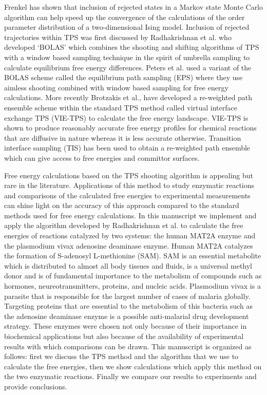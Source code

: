 \documentclass[journal=jpcbfk,manuscript=article,layout=traditional]{achemso}
\begin{document}
Frenkel has shown that inclusion of rejected states in a Markov state Monte 
Carlo algorithm can help speed up the convergence of the calculations of 
the order parameter distribution of a two-dimensional
Ising model. \cite{Frenkel04ProcNatAcadSci101p17571}
Inclusion of rejected trajectories within TPS was first discussed by Radhakrishnan 
et al. \cite{Radhakrishnan04JChemPhys121p2436} who developed `BOLAS' which combines 
the shooting and shifting algorithms of TPS with a window based sampling technique 
in the spirit of umbrella sampling to calculate equilibrium free energy 
differences. Peters et al. used a variant of the BOLAS scheme called the 
equilibrium path sampling (EPS) where they use aimless shooting 
combined with window based sampling for free energy calculations. 
\cite{Peters08JAmChemSoc130p17342,Beckham10epsbook} 
More recently Brotzakis et al., \cite{Brotzakis19JChemPhys151p174111}
have developed a re-weighted path ensemble scheme within the standard TPS method 
called virtual interface exchange TPS (VIE-TPS) to calculate the free energy 
landscape. VIE-TPS is shown to produce reasonably accurate free energy profiles for 
chemical reactions that are diffusive in nature whereas it is less accurate otherwise.
Transition interface sampling (TIS) has been used to obtain 
a re-weighted path ensemble which can give access to free energies 
and committor surfaces. \cite{Rogal10JChemPhys17p174109}

Free energy calculations based on the TPS shooting algorithm is 
appealing but rare in the literature. Applications of this 
method to study enzymatic reactions and comparisons of the calculated 
free energies to experimental measurements can shine light on the 
accuracy of this approach compared to the standard methods used for 
free energy calculations.    
In this manuscript we implement and apply the 
algorithm developed by Radhakrishnan et al. \cite{Radhakrishnan04JChemPhys121p2436} 
to calculate the free energies of reactions catalyzed by two systems:
the human MAT2A enzyme and the plasmodium vivax adenosine deaminase 
enzyme. \cite{Luo07JAmChemSoc129p8008,Ho09Biochemistry48p9618}
Human MAT2A catalyzes the formation of S-adenosyl L-methionine (SAM).
SAM is an essential metabolite which is 
distributed to almost all body tissues and fluids, is a universal 
methyl donor and is of fundamental importance to the metabolism of 
compounds such as hormones, neureotransmitters, proteins, 
and nucleic acids. \cite{Friedel89Drugs38p389}
Plasmodium vivax is a parasite that is responsible for the largest number 
of cases of malaria globally. Targeting proteins that are essential to
the metabolism of this bacteria such as the adenosine deaminase enzyme 
is a possible anti-malarial drug development strategy. \cite{Madrid08JBiolChem283p35899} 
These enzymes were chosen not only because of their importance in 
biochemical applications but also because of the availability of experimental 
results with which comparisons can be drawn. This manuscript is organized as 
follows: first we discuss the TPS method and the algorithm that we use 
to calculate the free energies, then we show calculations which apply this 
method on the two enzymatic reactions. Finally we compare our results to experiments
and provide conclusions. 
\end{document}
